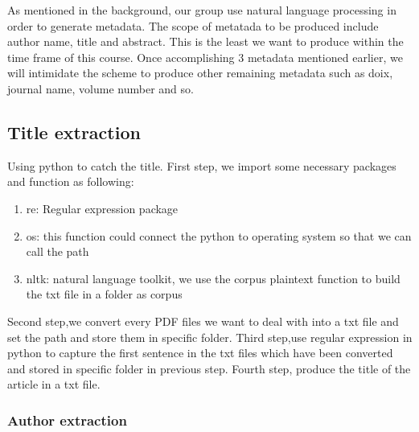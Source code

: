 	
As mentioned in the background, our group use natural language processing in order to generate metadata. The scope of metatada to be produced include author name, title and abstract. This is the least we want to produce within the time frame of this course. Once accomplishing 3 metadata mentioned earlier, we will intimidate the scheme to produce other remaining metadata such as doix, journal name, volume number and so. 
\subsection*{Title extraction}
Using python to catch the title. First step, we import some necessary packages and function as following:
\begin{enumerate}
	\item re: Regular expression package
	\item os: this function could connect the python to operating system so that we can call the path
	\item nltk: natural language toolkit, we use the corpus plaintext function to build the txt file in a folder as corpus
\end{enumerate}  
Second step,we convert every PDF files we want to deal with into a txt file and set the path and store them in specific folder.
Third step,use regular expression in python to capture the first sentence in the txt files which have been converted and stored in specific folder in previous step. 
Fourth step, produce the title of the article in a txt file.   

\subsubsection*{Author extraction}



